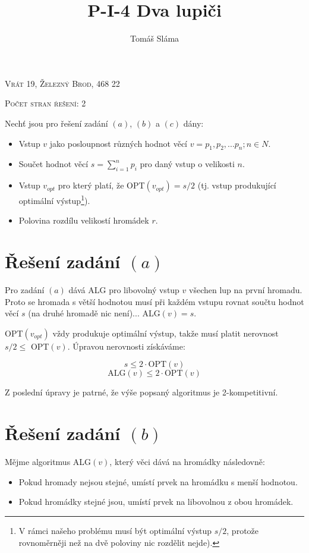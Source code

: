 \documentclass[a4paper, 12pt]{article}
\title{P-I-4 Dva lupiči}
\author{Tomáš Sláma}
\date{}
\begin{document}
  \maketitle

  \bigskip
  \begin{center}
    \textsc{Vrát 19, Železný Brod, 468 22}

    \textsc{Počet stran řešení: 2}
  \end{center}

  \newpage

  Nechť jsou pro řešení zadání $(a)$, $(b)$ a $(c)$ dány:
  \begin{itemize}
    \item Vstup $v$ jako posloupnost různých hodnot věcí $v=p_1, p_2,...p_n; n \in N$.
    \item Součet hodnot věcí $s=\sum\limits_{i=1}^n p_i$ pro daný vstup o velikosti $n$.
    \item Vstup $v_{opt}$ pro který platí, že OPT$(v_{opt})=s/2$ (tj. vstup produkující optimální výstup\footnote{V rámci našeho problému musí být optimální výstup $s/2$, protože rovnoměrněji než na dvě poloviny nic rozdělit nejde).}).
    \item Polovina rozdílu velikostí hromádek $r$.
  \end{itemize}

  \section{Řešení zadání $(a)$}
  Pro zadání $(a)$ dává ALG pro libovolný vstup $v$ všechen lup na první hromadu. Proto se hromada s větší hodnotou musí při každém vstupu rovnat součtu hodnot věcí $s$ (na druhé hromadě nic není)... ALG$(v)=s$.

  OPT$(v_{opt})$ vždy produkuje optimální výstup, takže musí platit nerovnost $s/2 \le$ OPT$(v)$. Úpravou nerovnosti získáváme:

  $$s \le 2\cdot\text{OPT}(v)$$
  $$\text{ALG}(v) \le 2 \cdot\text{OPT}(v)$$

  Z poslední úpravy je patrné, že výše popsaný algoritmus je 2-kompetitivní.

  \section{Řešení zadání $(b)$}
  Mějme algoritmus ALG$(v)$, který věci dává na hromádky následovně:
  \begin{itemize}
    \item Pokud hromady nejsou stejné, umístí prvek na hromádku s menší hodnotou.
    \item Pokud hromádky stejné jsou, umístí prvek na libovolnou z obou hromádek.
  \end{itemize}
\end{document}
